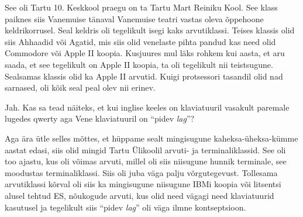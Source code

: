 See oli Tartu 10. Keskkool praegu on ta
Tartu Mart Reiniku Kool. See klass paiknes siis  Vanemuise tänaval Vanemuise teatri vastas 
oleva õppehoone keldrikorrusel. 
Seal keldris oli tegelikult isegi kaks arvutiklassi. Teises klassis olid siis 
Ahhaadid või Agatid, mis siis olid venelaste pihta pandud 
kas need olid Commodore  või Apple II koopia. Kusjuures mul läks rohkem kui aasta, et aru saada, et see tegelikult 
on Apple II koopia,  ta oli 
tegelikult nii teistsugune. Sealsamas klassis olid ka Apple 
II arvutid. Kuigi protsessori tasandil olid nad sarnased, 
oli  kõik seal peal olev nii erinev. 


Jah. Kas sa tead näiteks, et kui inglise keeles on klaviatuuril vasakult paremale lugedes 
qwerty aga Vene klaviatuuril on \enquote{pidev \emph{lag}}? 


Aga ära ütle selles mõttes, et hüppame sealt mingisugune kaheksa-üheksa-kümme 
aastat edasi, siis olid mingid Tartu Ülikoolil arvuti- ja 
terminaliklassid. See oli too ajastu, kus oli võimas arvuti, millel oli siis 
niisugune hunnik terminale, see moodustas terminaliklassi. Siis oli juba 
väga palju võrgutegevust. Tollesama arvutiklassi kõrval oli siis ka mingisugune 
niisugune IBMi koopia või litsentsi alusel tehtud ES, nõukogude arvuti, kus olid need 
vägagi need klaviatuurid kasutusel ja tegelikult siis \enquote{pidev 
\emph{lag}} oli väga ilmne kontseptsioon.

